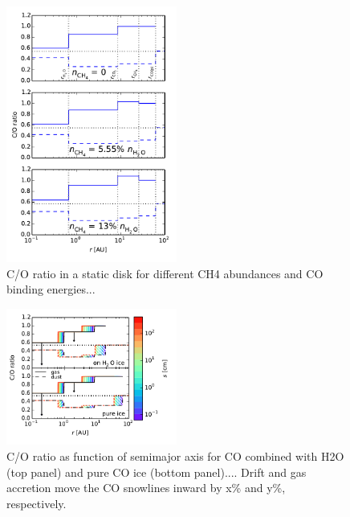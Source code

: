 \documentclass[apj]{emulateapj}
\begin{document}
\begin{figure}[h!]
\centering
\includegraphics[width=0.5\textwidth]{../../figs/C_O_ratio_CH4.pdf}
\caption{C/O ratio in a static disk for different CH4 abundances and CO binding energies...} 
\label{fig:COstatic}
\end{figure}


\begin{figure}[h!]
\centering
\includegraphics[width=0.5\textwidth]{../../figs/C_O_water_ice.pdf}
\caption{C/O ratio as function of semimajor axis for CO combined with H2O (top panel) and pure CO ice (bottom panel).... Drift and gas accretion move the CO snowlines inward by x\% and y\%, respectively.} 
\label{fig:CO_ratio}
\end{figure}
\end{document}
